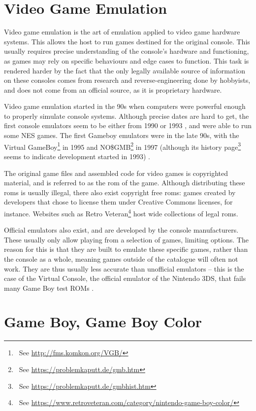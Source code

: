\documentclass[11pt]{informatics-report}
\newcommand{\ftnt}[1]{\footnote{~See \url{#1}}}
\begin{document}
\section{Video Game Emulation}

Video game emulation is the art of emulation applied to video game hardware systems. This allows the host to run games destined for the original console. This usually requires precise understanding of the console's hardware and functioning, as games may rely on specific behaviours and edge cases to function. This task is rendered harder by the fact that the only legally available source of information on these consoles comes from research and reverse-engineering done by hobbyists, and does not come from an official source, as it is proprietary hardware.

Video game emulation started in the 90s when computers were powerful enough to properly simulate console systems. Although precise dates are hard to get, the first console emulators seem to be either from 1990 or 1993 \cite{first_nes_emu}, and were able to run some NES games. The first Gameboy emulators were in the late 90s, with the Virtual GameBoy\ftnt{http://fms.komkon.org/VGB/} in 1995 and NO\$GMB\ftnt{https://problemkaputt.de/gmb.htm} in 1997 (although its history page\ftnt{https://problemkaputt.de/gmbhist.htm} seems to indicate development started in 1993) \cite{first_gb_emus}.

The original game files and assembled code for video games is copyrighted material, and is referred to as the \gls{rom} of the game. Although distributing these \glspl{rom} is usually illegal, there also exist copyright free \glspl{rom}: games created by developers that chose to license them under Creative Commons licenses, for instance. Websites such as Retro Veteran\ftnt{https://www.retroveteran.com/category/nintendo-game-boy-color/} host wide collections of legal \glspl{rom}.

Official emulators also exist, and are developed by the console manufacturers. These usually only allow playing from a selection of games, limiting options. The reason for this is that they are built to emulate these specific games, rather than the console as a whole, meaning games outside of the catalogue will often not work. They are thus usually less accurate than unofficial emulators -- this is the case of the Virtual Console, the official emulator of the Nintendo 3DS, that fails many Game Boy test ROMs \cite[Test ROMs]{gbdev_wiki}.

\section{Game Boy, Game Boy Color}
\end{document}
